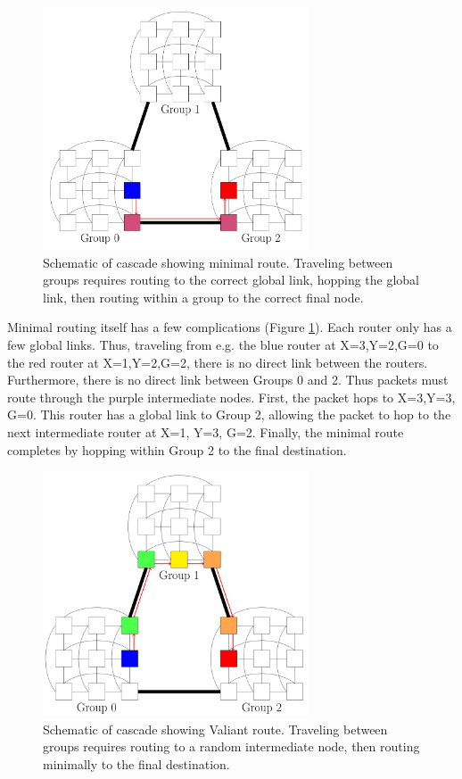 \begin{figure}[h!]
\centering
\includegraphics[width=0.7\textwidth]{figures/tikz/cascade/cascademinroute.png}
\caption{Schematic of cascade showing minimal route. Traveling between groups requires routing to the correct global link, hopping the global link, then routing within a group to the correct final node.}
\label{fig:topologies:cascademinroute}
\end{figure}

Minimal routing itself has a few complications (Figure \ref{fig:topologies:cascademinroute}).
Each router only has a few global links.
Thus, traveling from e.g. the blue router at X=3,Y=2,G=0 to the red router at X=1,Y=2,G=2, there is no direct link between the routers.
Furthermore, there is no direct link between Groups 0 and 2.
Thus packets must route through the purple intermediate nodes.
First, the packet hops to X=3,Y=3, G=0.
This router has a global link to Group 2, allowing the packet to hop to the next intermediate router at X=1, Y=3, G=2.
Finally, the minimal route completes by hopping within Group 2 to the final destination.

\begin{figure}[h!]
\centering
\includegraphics[width=0.7\textwidth]{figures/tikz/cascade/cascadevaliant.png}
\caption{Schematic of cascade showing Valiant route. Traveling between groups requires routing to a random intermediate node, then routing minimally to the final destination.}
\label{fig:topologies:cascadevaliantroute}
\end{figure}

